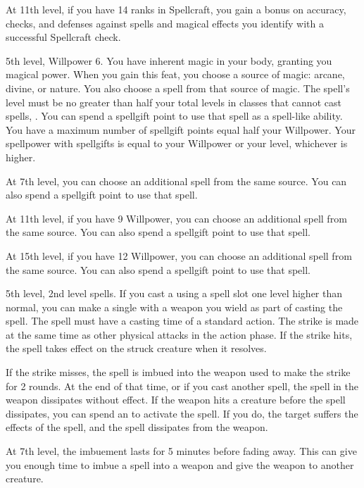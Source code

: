     At 11th level, if you have 14 ranks in Spellcraft, you gain a  bonus on accuracy, checks, and defenses against spells and magical effects you identify with a successful Spellcraft check.

    \featpres 5th level, Willpower 6.
    \featben You have inherent magic in your body, granting you magical power.
    When you gain this feat, you choose a source of magic: arcane, divine, or nature.
    You also choose a spell from that source of magic.
    The spell's level must be no greater than half your total levels in classes that cannot cast spells, .
    You can spend a spellgift point to use that spell as a spell-like ability.
    You have a maximum number of spellgift points equal half your Willpower.
    Your spellpower with spellgifts is equal to your Willpower or your level, whichever is higher.

    At 7th level, you can choose an additional spell from the same source. You can also spend a spellgift point to use that spell.

    At 11th level, if you have 9 Willpower, you can choose an additional spell from the same source. You can also spend a spellgift point to use that spell.

    At 15th level, if you have 12 Willpower, you can choose an additional spell from the same source. You can also spend a spellgift point to use that spell.

    \featpre 5th level, 2nd level spells.
    \featben If you cast a  using a spell slot one level higher than normal, you can make a single  with a weapon you wield as part of casting the spell.
    The spell must have a casting time of a standard action.
    The strike is made at the same time as other physical attacks in the action phase.
    If the strike hits, the spell takes effect on the struck creature when it resolves.

    If the strike misses, the spell is imbued into the weapon used to make the strike for 2 rounds.
    At the end of that time, or if you cast another spell, the spell in the weapon dissipates without effect.
    If the weapon hits a creature before the spell dissipates, you can spend an  to activate the spell.
    If you do, the target suffers the effects of the spell, and the spell dissipates from the weapon.

    At 7th level, the imbuement lasts for 5 minutes before fading away.
    This can give you enough time to imbue a spell into a weapon and give the weapon to another creature.

